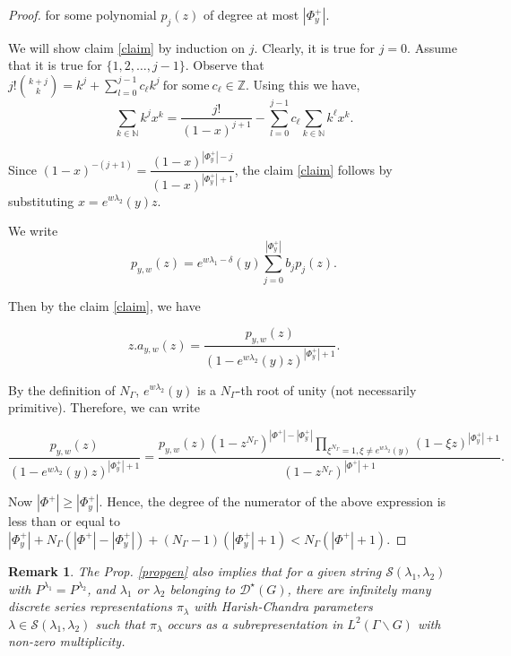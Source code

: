 \documentclass[11 pt]{amsart}
\newcommand{\Z}{{\mathbb Z}}
\newcommand{\N}{{\mathbb N}}
\theoremstyle{definition}
\newtheorem{remark}{Remark}[section]
\numberwithin{equation}{section}
\begin{document}
\begin{proof}
\noindent for some polynomial $p_j(z)$ of degree at most $|\Phi_y^+|$.

\noindent We will show claim \ref{claim} by induction on $j$. Clearly, it is true for $j=0$. Assume that it is true for $\{1,2, \dots , j-1\}$. Observe that $j ! { k+j \choose k} = k^j + \sum\limits_{l=0}^{j-1} c_{\ell} k^j\ \text{for some}\ c_{\ell} \in \Z$. Using this we have, 
$$\sum\limits_{k \in \N}k^j x^k = \dfrac{j!}{(1-x)^{j+1}} - \sum\limits_{l=0}^{j-1}c_{\ell} \sum\limits_{k \in \N} k^{\ell} x^k.$$

\noindent Since $(1-x)^{-(j+1)}=\dfrac{(1-x)^{|\Phi^+_y|-j}}{(1-x)^{|\Phi^+_y|+1}}$, the claim \ref{claim} follows by substituting $x=e^{w \lambda_2}(y) z$.

\vspace{8pt} 

\noindent We write $$p_{y,w}(z)=e^{w \lambda_1 - \delta}(y)\sum\limits_{j=0}^{|\Phi^+_y|} b_j p_j (z).$$ 

\noindent Then by the claim \ref{claim}, we have 

$$z. a_{y,w}(z)=\frac{p_{y,w}(z)}{(1 - e^{w \lambda_2}(y) z)^{|\Phi_y^+|+1}}.$$

\noindent By the definition of $N_{\Gamma}$,  $e^{w \lambda_2}(y)$ is a $N_{\Gamma}$-th root of unity (not necessarily primitive). Therefore, we can write  

$$ \frac{p_{y,w}(z)}{(1 - e^{w \lambda_2}(y) z)^{|\Phi_y^+|+1}} = \frac{p_{y,w}(z) (1-z^{N_{\Gamma}})^{|\Phi^+|-|\Phi_y^+|} \prod\limits_{\xi^{N_{\Gamma}}=1, \xi \neq e^{w \lambda_2}(y)}(1-\xi z)^{|\Phi_y^+| +1}}{(1 - z^{N_{\Gamma}})^{|\Phi^+|+1}}.$$

\noindent Now $|\Phi^+| \geq |\Phi_y^+|$. Hence, the degree of the numerator of the above expression is less than or equal to $|\Phi_y^+| + N_{\Gamma} (|\Phi^+| - |\Phi_y^+| )+ (N_{\Gamma}-1) (|\Phi_y^+| +1) < N_{\Gamma} (|\Phi^+| +1).$
\end{proof}

\begin{remark}
\textit{The Prop. \ref{propgen} also implies that for a given string $\mathcal{S}(\lambda_1, \lambda_2)$ with $P^{\lambda_1}=P^{\lambda_2}$, and $\lambda_1$ or $\lambda_2$ belonging to $\mathcal{D}^{\star}(G)$, there are infinitely many discrete series representations $\pi_{\lambda}$ with Harish-Chandra parameters $\lambda \in \mathcal{S}(\lambda_1, \lambda_2)$ such that $\pi_{\lambda}$ occurs as a subrepresentation in $L^2(\Gamma \backslash G)$ with non-zero multiplicity.} 
\end{remark}
\end{document}
